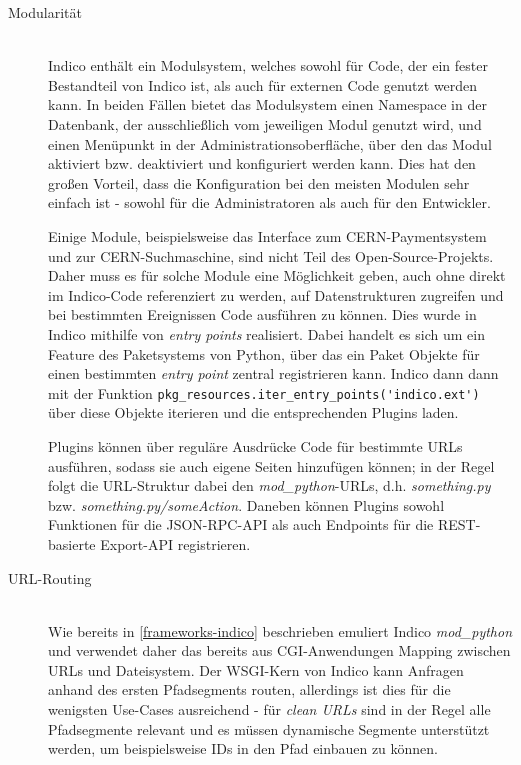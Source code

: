 \begin{description}
\item[Modularität] \hfill \\
Indico enthält ein Modulsystem, welches sowohl für Code, der ein fester Bestandteil von Indico ist,
als auch für externen Code genutzt werden kann. In beiden Fällen bietet das Modulsystem einen
Namespace in der Datenbank, der ausschließlich vom jeweiligen Modul genutzt wird, und einen
Menüpunkt in der Administrationsoberfläche, über den das Modul aktiviert bzw. deaktiviert und
konfiguriert werden kann. Dies hat den großen Vorteil, dass die Konfiguration bei den meisten
Modulen sehr einfach ist - sowohl für die Administratoren als auch für den Entwickler.

Einige Module, beispielsweise das Interface zum CERN-Paymentsystem und zur CERN-Suchmaschine, sind
nicht Teil des Open-Source-Projekts. Daher muss es für solche Module eine Möglichkeit geben, auch
ohne direkt im Indico-Code referenziert zu werden, auf Datenstrukturen zugreifen und bei bestimmten
Ereignissen Code ausführen zu können. Dies wurde in Indico mithilfe von \emph{entry points}
realisiert. Dabei handelt es sich um ein Feature des Paketsystems von Python, über das ein Paket
Objekte für einen bestimmten \emph{entry point} zentral registrieren kann. Indico dann dann mit der
Funktion \lstinline{pkg_resources.iter_entry_points('indico.ext')} über diese Objekte iterieren und
die entsprechenden Plugins laden.

Plugins können über reguläre Ausdrücke Code für bestimmte URLs ausführen, sodass sie auch eigene
Seiten hinzufügen können; in der Regel folgt die URL-Struktur dabei den \emph{mod\_python}-URLs,
d.h. \emph{something.py} bzw. \emph{something.py/someAction}. Daneben können Plugins sowohl
Funktionen für die JSON-RPC-API als auch Endpoints für die REST-basierte Export-API registrieren.


\item[URL-Routing] \hfill \\
Wie bereits in \autoref{frameworks-indico} beschrieben emuliert Indico \emph{mod\_python} und
verwendet daher das bereits aus CGI-Anwendungen Mapping zwischen URLs und Dateisystem. Der WSGI-Kern
von Indico kann Anfragen anhand des ersten Pfadsegments routen, allerdings ist dies für die
wenigsten Use-Cases ausreichend - für \emph{clean URLs} sind in der Regel alle Pfadsegmente relevant
und es müssen dynamische Segmente unterstützt werden, um beispielsweise IDs in den Pfad einbauen zu
können.


\end{description}
